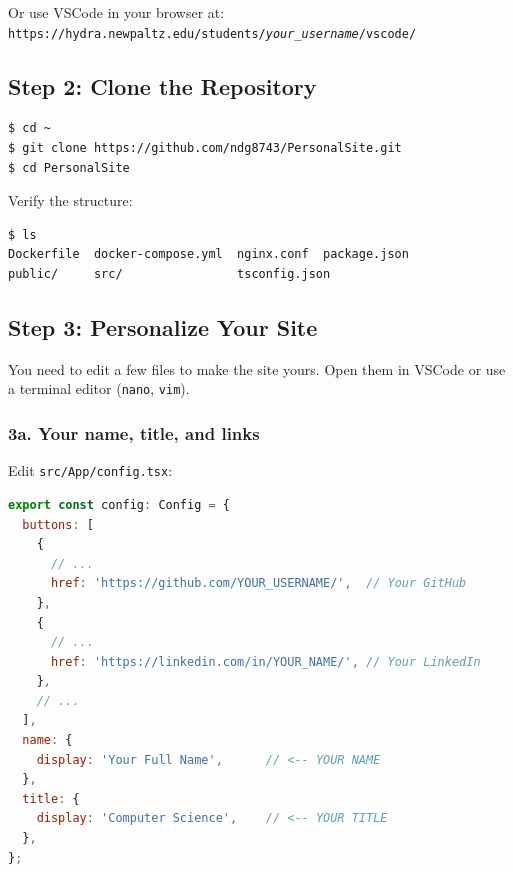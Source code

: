 \documentclass[11pt, letterpaper]{article}
\begin{document}
Or use VSCode in your browser at:\\
\texttt{https://hydra.newpaltz.edu/students/\textit{your\_username}/vscode/}

\subsection{Step 2: Clone the Repository}

\begin{lstlisting}[style=terminal]
$ cd ~
$ git clone https://github.com/ndg8743/PersonalSite.git
$ cd PersonalSite
\end{lstlisting}

Verify the structure:

\begin{lstlisting}[style=terminal]
$ ls
Dockerfile  docker-compose.yml  nginx.conf  package.json
public/     src/                tsconfig.json
\end{lstlisting}

\subsection{Step 3: Personalize Your Site}

You need to edit a few files to make the site yours. Open them in VSCode or
use a terminal editor (\texttt{nano}, \texttt{vim}).

\subsubsection{3a. Your name, title, and links}

Edit \texttt{src/App/config.tsx}:

\begin{lstlisting}[style=code, language=JavaScript, caption={src/App/config.tsx --- change the highlighted values}]
export const config: Config = {
  buttons: [
    {
      // ...
      href: 'https://github.com/YOUR_USERNAME/',  // Your GitHub
    },
    {
      // ...
      href: 'https://linkedin.com/in/YOUR_NAME/', // Your LinkedIn
    },
    // ...
  ],
  name: {
    display: 'Your Full Name',      // <-- YOUR NAME
  },
  title: {
    display: 'Computer Science',    // <-- YOUR TITLE
  },
};
\end{lstlisting}
\end{document}
